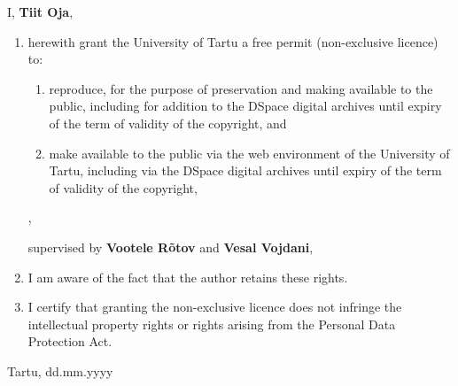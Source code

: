 \documentclass{style/thesis}
\begin{document}
\renewcommand{\labelenumii}{\theenumii}
\renewcommand{\theenumii}{\theenumi.\arabic{enumii}.}

I, \textbf{Tiit Oja},

\begin{enumerate}
	\item herewith grant the University of Tartu a free permit (non-exclusive licence) to:

	\begin{enumerate}[label*=\arabic*.]
		\item reproduce, for the purpose of preservation and making available to the public, including for addition to the DSpace digital archives until expiry of the term of validity of the copyright, and

		\item make available to the public via the web environment of the University of Tartu, including via the DSpace digital archives until expiry of the term of validity of the copyright,
	\end{enumerate}

	\textbf{\articleName},

	supervised by \textbf{Vootele Rõtov} and \textbf{Vesal Vojdani},

	\item I am aware of the fact that the author retains these rights.
	\item I certify that granting the non-exclusive licence does not infringe the intellectual property rights or rights arising from the Personal Data Protection Act.
\end{enumerate}

\noindent
Tartu, dd.mm.yyyy
\end{document}
